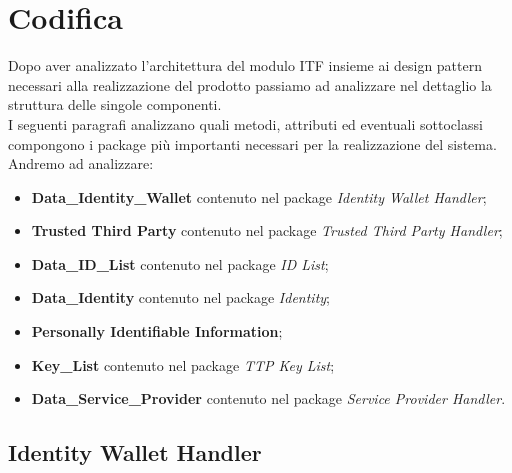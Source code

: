 
\chapter{Codifica}
\label{cap:codifica}
Dopo aver analizzato l'architettura del modulo \gls{ITF} insieme ai design pattern necessari alla realizzazione del prodotto passiamo ad analizzare nel dettaglio la struttura delle singole componenti.\\
I seguenti paragrafi analizzano quali metodi, attributi ed eventuali sottoclassi compongono i package più importanti necessari per la realizzazione del sistema.\\
Andremo ad analizzare:
\begin{itemize}
	\item \textbf{Data\_Identity\_Wallet} contenuto nel package \textit{Identity Wallet Handler};
	\item \textbf{Trusted Third Party} contenuto nel package \textit{Trusted Third Party Handler};
	\item \textbf{Data\_ID\_List} contenuto nel package \textit{ID List};
	\item \textbf{Data\_Identity} contenuto nel package \textit{Identity};
	\item \textbf{Personally Identifiable Information};
	\item \textbf{Key\_List} contenuto nel package \textit{TTP Key List};
	\item \textbf{Data\_Service\_Provider} contenuto nel package \textit{Service Provider Handler}.
\end{itemize}
\newpage
\section{Identity Wallet Handler}
